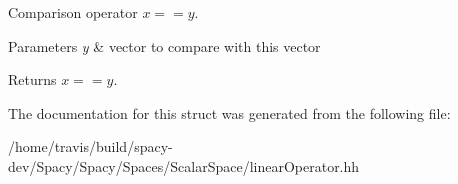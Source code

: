\-Comparison operator $ x==y$. 


\begin{DoxyParams}{\-Parameters}
{\em y} & vector to compare with this vector \\
\hline
\end{DoxyParams}
\begin{DoxyReturn}{\-Returns}
$ x==y$. 
\end{DoxyReturn}


\-The documentation for this struct was generated from the following file\-:\begin{DoxyCompactItemize}
\item 
/home/travis/build/spacy-\/dev/\-Spacy/\-Spacy/\-Spaces/\-Scalar\-Space/linear\-Operator.\-hh\end{DoxyCompactItemize}
